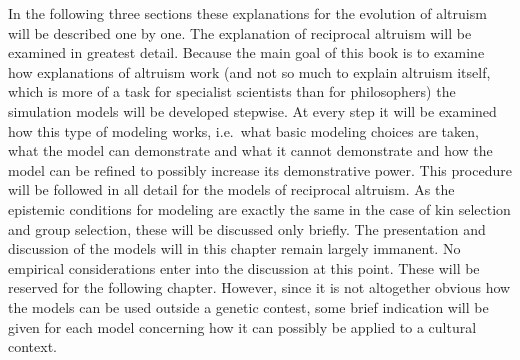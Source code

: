
In the following three sections these explanations for the evolution of
altruism will be described one by one. The explanation of reciprocal altruism
will be examined in greatest detail. Because the main goal of this book is
to examine how explanations of altruism work (and not so much to explain
altruism itself, which is more of a task for specialist scientists than
for philosophers) the simulation models will be developed stepwise. At every
step it will be examined how this type of modeling works, i.e.\ what basic
modeling choices are taken, what the model can demonstrate and what it cannot
demonstrate and how the model can be refined to possibly increase its
demonstrative power. This procedure will be followed in all detail for the
models of reciprocal altruism. As the epistemic conditions for modeling are
exactly the same in the case of kin selection and group selection, these will
be discussed only briefly. The presentation and discussion of the models will
in this chapter remain largely immanent. No empirical considerations enter
into the discussion at this point. These will be reserved for the following
chapter. However, since it is not altogether obvious how the models can be
used outside a genetic contest, some brief indication will be given for each
model concerning how it can possibly be applied to a cultural context.


